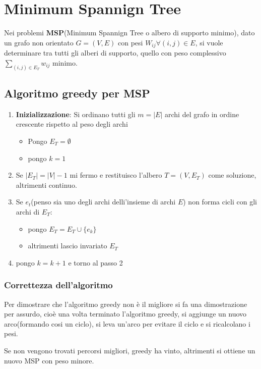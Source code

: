 \section{Minimum Spannign Tree}
Nei problemi \textbf{MSP}(Minimum Spannign Tree o albero di supporto minimo), dato un grafo non orientato $G=(V, E)$
con pesi $W_{ij} \forall (i, j) \in E$, si vuole determinare tra tutti gli alberi di supporto, quello con peso complessivo
$\sum_{(i,j) \in E_T} w_{ij}$ minimo.


\subsection{Algoritmo greedy per MSP}

\begin{enumerate}
    \item \textbf{Inizializzazione}: Si ordinano tutti gli $m = | E |$ archi del grafo in ordine crescente rispetto al peso degli archi
    \begin{itemize}
        \item Pongo $E_T = \emptyset$
        \item pongo $k = 1$
    \end{itemize}
    \item Se $|E_T| = |V| - 1$ mi fermo e restituisco l'albero $T = (V, E_T)$ come soluzione, altrimenti continuo.
    \item Se $e_t$(penso sia uno degli archi delli'insieme di archi $E$) non forma cicli con gli archi di $E_T$:
    \begin{itemize}
        \item pongo $E_T = E_T \cup \{e_k\}$
        \item altrimenti lascio invariato $E_T$
    \end{itemize}
    \item pongo $k = k + 1$ e torno al passo 2
\end{enumerate}

\subsubsection{Correttezza dell'algoritmo}
Per dimostrare che l'algoritmo greedy non è il migliore si fa una dimostrazione per assurdo,
cioè una volta terminato l'algoritmo greedy, si aggiunge un nuovo arco(formando cosi un ciclo), si leva 
un'arco per evitare il ciclo e si ricalcolano i pesi.

Se non vengono trovati percorsi migliori, greedy ha vinto, altrimenti si ottiene un nuovo MSP con peso minore.

